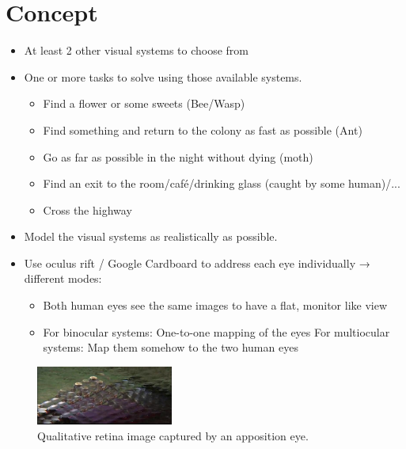 \documentclass{acm_proc_article-sp}
\begin{document}
\section{Concept}
\begin{itemize}
\item At least 2 other visual systems to choose from
\item One or more tasks to solve using those available systems.
  \begin{itemize}
    \item Find a flower or some sweets (Bee/Wasp)
    \item Find something and return to the colony as fast as possible (Ant)
    \item Go as far as possible in the night without dying (moth)
    \item Find an exit to the room/café/drinking glass (caught by some human)/...
    \item Cross the highway
  \end{itemize}
\item Model the visual systems as realistically as possible.
\item Use oculus rift / Google Cardboard to address each eye individually
→ different modes:
  \begin{itemize}
  \item Both human eyes see the same images to have a flat, monitor like view
  \item For binocular systems: One-to-one mapping of the eyes
        For multiocular systems: Map them somehow to the two human eyes
  \end{itemize}
\end{itemize}

\begin{figure}
  \centering
  \includegraphics[width=0.4\textwidth]{bee-vision.jpg}
  \caption{Qualitative retina image captured by an apposition eye.}
  \label{appositeeye}
\end{figure}
\end{document}
